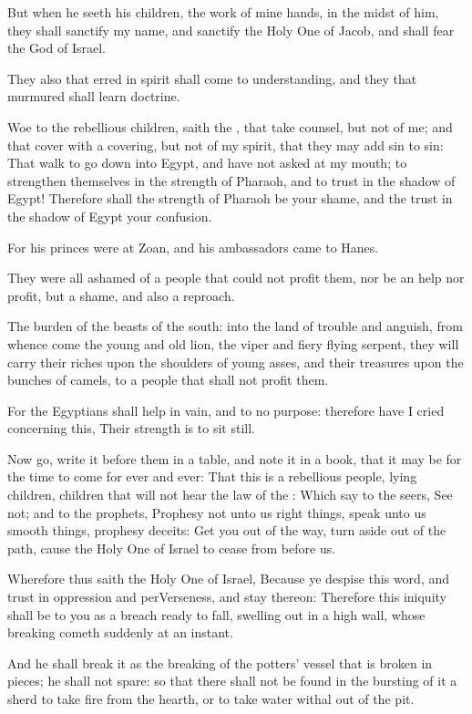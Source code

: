 \Verse But when he seeth his children, the work of mine hands, in the midst of him, they shall sanctify my name, and sanctify the Holy One of Jacob, and shall fear the God of Israel.

\Verse They also that erred in spirit shall come to understanding, and they that murmured shall learn doctrine.


\Chapter
\Verse Woe to the rebellious children, saith the \LORD, that take counsel, but not of me; and that cover with a covering, but not of my spirit, that they may add sin to sin: \Verse That walk to go down into Egypt, and have not asked at my mouth; to strengthen themselves in the strength of Pharaoh, and to trust in the shadow of Egypt!  \Verse Therefore shall the strength of Pharaoh be your shame, and the trust in the shadow of Egypt your confusion.

\Verse For his princes were at Zoan, and his ambassadors came to Hanes.

\Verse They were all ashamed of a people that could not profit them, nor be an help nor profit, but a shame, and also a reproach.

\Verse The burden of the beasts of the south: into the land of trouble and anguish, from whence come the young and old lion, the viper and fiery flying serpent, they will carry their riches upon the shoulders of young asses, and their treasures upon the bunches of camels, to a people that shall not profit them.

\Verse For the Egyptians shall help in vain, and to no purpose: therefore have I cried concerning this, Their strength is to sit still.

\Verse Now go, write it before them in a table, and note it in a book, that it may be for the time to come for ever and ever: \Verse That this is a rebellious people, lying children, children that will not hear the law of the \LORD: \Verse Which say to the seers, See not; and to the prophets, Prophesy not unto us right things, speak unto us smooth things, prophesy deceits: \Verse Get you out of the way, turn aside out of the path, cause the Holy One of Israel to cease from before us.

\Verse Wherefore thus saith the Holy One of Israel, Because ye despise this word, and trust in oppression and perVerseness, and stay thereon: \Verse Therefore this iniquity shall be to you as a breach ready to fall, swelling out in a high wall, whose breaking cometh suddenly at an instant.

\Verse And he shall break it as the breaking of the potters' vessel that is broken in pieces; he shall not spare: so that there shall not be found in the bursting of it a sherd to take fire from the hearth, or to take water withal out of the pit.


